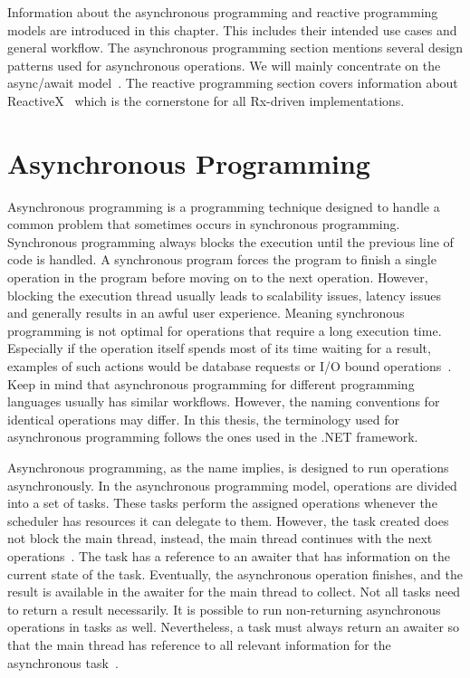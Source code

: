 Information about the asynchronous programming and reactive programming models are introduced in this chapter. This includes their intended use cases and general workflow. The asynchronous programming section mentions several design patterns used for asynchronous operations. We will mainly concentrate on the async/await model~\cite{DOC:AsyncAwait}. The reactive programming section covers information about ReactiveX~\cite{WEB:ReactiveXMainPage} which is the cornerstone for all Rx-driven implementations.
\section{Asynchronous Programming}
\label{section:AsyncProgramming}
Asynchronous programming is a programming technique designed to handle a common problem that sometimes occurs in synchronous programming. Synchronous programming always blocks the execution until the previous line of code is handled. A synchronous program forces the program to finish a single operation in the program before moving on to the next operation. However, blocking the execution thread usually leads to scalability issues, latency issues and generally results in an awful user experience. Meaning synchronous programming is not optimal for operations that require a long execution time. Especially if the operation itself spends most of its time waiting for a result, examples of such actions would be database requests or I/O bound operations~\cite{VIDEO:AsyncConBack, WEB:AsyncAwaitTut}. Keep in mind that asynchronous programming for different programming languages usually has similar workflows. However, the naming conventions for identical operations may differ. In this thesis, the terminology used for asynchronous programming follows the ones used in the .NET framework.

Asynchronous programming, as the name implies, is designed to run operations asynchronously. In the asynchronous programming model, operations are divided into a set of tasks. These tasks perform the assigned operations whenever the scheduler has resources it can delegate to them.
However, the task created does not block the main thread, instead, the main thread continues with the next operations~\cite{WEB:AsyncAwaitTut, VIDEO:AsyncConBack, DOC:AsyncAwait}.
The task has a reference to an awaiter that has information on the current state of the task. Eventually, the asynchronous operation finishes, and the result is available in the awaiter for the main thread to collect. Not all tasks need to return a result necessarily. It is possible to run non-returning asynchronous operations in tasks as well. Nevertheless, a task must always return an awaiter so that the main thread has reference to all relevant information for the asynchronous task~\cite{WEB:AsyncAwaitTut}.

